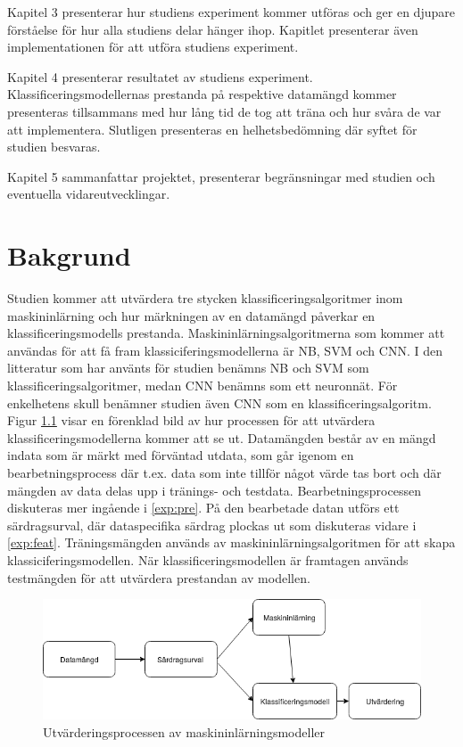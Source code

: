 \documentclass{kaumasters} %
\begin{document}
Kapitel 3 presenterar hur studiens experiment kommer utföras och ger en djupare förståelse för hur alla studiens delar hänger ihop. Kapitlet presenterar även implementationen för att utföra studiens experiment. 

Kapitel 4 presenterar resultatet av studiens experiment. Klassificeringsmodellernas prestanda på respektive datamängd kommer presenteras tillsammans med hur lång tid de tog att träna och hur svåra de var att implementera. Slutligen presenteras en helhetsbedömning där syftet för studien besvaras.

Kapitel 5 sammanfattar projektet, presenterar begränsningar med studien och eventuella vidareutvecklingar.

\chapter{Bakgrund}\label{bak}
Studien kommer att utvärdera tre stycken klassificeringsalgoritmer inom maskininlärning och hur märkningen av en datamängd påverkar en klassificeringsmodells prestanda. Maskininlärningsalgoritmerna som kommer att användas för att få fram klassiciferingsmodellerna är NB, SVM  och CNN. I den litteratur som har använts för studien benämns NB och SVM som klassificeringsalgoritmer, medan CNN benämns som ett neuronnät. För enkelhetens skull benämner studien även CNN som en klassificeringsalgoritm. Figur \ref{fig:overfig} visar en förenklad bild av hur processen för att utvärdera klassificeringsmodellerna kommer att se ut. Datamängden består av en mängd indata som är märkt med förväntad utdata, som går igenom en bearbetningsprocess där t.ex. data som inte tillför något värde tas bort och där mängden av data delas upp i tränings- och testdata.  Bearbetningsprocessen diskuteras mer ingående i \ref{exp:pre}. På den bearbetade datan utförs ett särdragsurval, där dataspecifika särdrag plockas ut som diskuteras vidare i \ref{exp:feat}. Träningsmängden används av maskininlärningsalgoritmen för att skapa klassiciferingsmodellen. När klassificeringsmodellen är framtagen används testmängden för att utvärdera prestandan av modellen.


\begin{figure}[h]
\includegraphics[width=12cm]{oversiktsfigur}
\centering
\caption{Utvärderingsprocessen av maskininlärningsmodeller}
\label{fig:overfig}
\end{figure}
\end{document}
